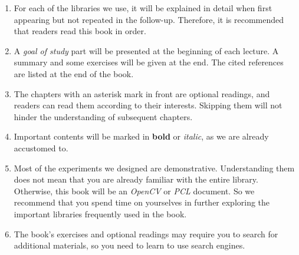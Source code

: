 \begin{enumerate}
	\item For each of the libraries we use, it will be explained in detail when first appearing but not repeated in the follow-up. Therefore, it is recommended that readers read this book in order.

	\item A \textit{goal of study} part will be presented at the beginning of each lecture. A summary and some exercises will be given at the end. The cited references are listed at the end of the book.

	\item The chapters with an asterisk mark in front are optional readings, and readers can read them according to their interests. Skipping them will not hinder the understanding of subsequent chapters.

	\item Important contents will be marked in \textbf{bold} or \emph{italic}, as we are already accustomed to.

	\item Most of the experiments we designed are demonstrative. Understanding them does not mean that you are already familiar with the entire library. Otherwise, this book will be an \textit{OpenCV} or \textit{PCL} document. So we recommend that you spend time on yourselves in further exploring the important libraries frequently used in the book.

	\item The book's exercises and optional readings may require you to search for additional materials, so you need to learn to use search engines.
\end{enumerate}

